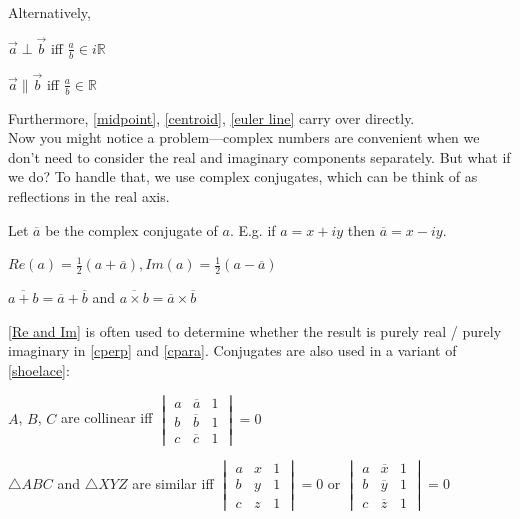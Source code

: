 \documentclass[11pt]{scrartcl}
\begin{document}
Alternatively,
\begin{fact} \label{cperp}
  $\vec{a} \perp \vec{b}$ iff $\frac{a}{b}\in i\mathbb{R}$
\end{fact}
\begin{fact} \label{cpara}
  $\vec{a} \parallel \vec{b}$ iff $\frac{a}{b}\in\mathbb{R}$
\end{fact}
Furthermore, \ref{midpoint}, \ref{centroid}, \ref{euler line} carry over directly. \\
Now you might notice a problem---complex numbers are convenient when we don't need to consider the real and imaginary components separately. But what if we do? To handle that, we use complex conjugates, which can be think of as reflections in the real axis. 
\begin{definition}
  Let $\overline{a}$ be the complex conjugate of $a$. E.g. if $a=x+iy$ then $\overline{a}=x-iy$.
\end{definition}
\begin{fact} \label{Re and Im}
  $Re(a)=\frac{1}{2}(a+\overline{a}), Im(a)=\frac{1}{2}(a-\overline{a})$
\end{fact}
\begin{fact} \label{distributive}
  $\overline{a+b} = \overline{a}+\overline{b}$ and $\overline{a\times b}=\overline{a}\times\overline{b}$
\end{fact}
\ref{Re and Im} is often used to determine whether the result is purely real / purely imaginary in \ref{cperp} and \ref{cpara}.
Conjugates are also used in a variant of \ref{shoelace}:
\begin{fact} \label{clinear}
  $A$, $B$, $C$ are collinear iff
  $\begin{vmatrix} a & \overline{a} & 1 \\ b & \overline{b} & 1 \\ c & \overline{c} & 1 \end{vmatrix} = 0$\\
\end{fact}
\begin{fact}
  $\triangle ABC$ and $\triangle XYZ$ are similar iff $\begin{vmatrix} a & x & 1 \\ b & y & 1 \\ c & z & 1 \end{vmatrix} = 0$ or $\begin{vmatrix} a & \overline{x} & 1 \\ b & \overline{y} & 1 \\ c & \overline{z} & 1 \end{vmatrix} = 0$
\end{fact}
\end{document}
